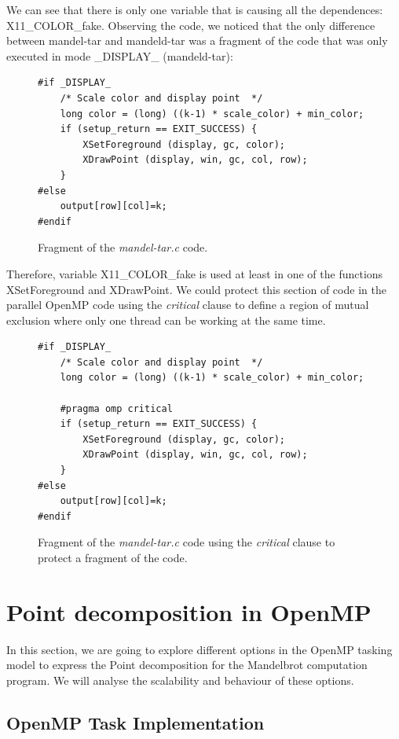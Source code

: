 \documentclass[12pt, a4paper]{article}
\begin{document}
We can see that there is only one variable that is causing all the dependences: X11\_COLOR\_fake. Observing the code, we noticed that the only difference between mandel-tar and mandeld-tar was a fragment of the code that was only executed in mode \_DISPLAY\_ (mandeld-tar):

\begin{figure}[H]
\begin{lstlisting}
#if _DISPLAY_
    /* Scale color and display point  */
    long color = (long) ((k-1) * scale_color) + min_color;
    if (setup_return == EXIT_SUCCESS) {
        XSetForeground (display, gc, color);
        XDrawPoint (display, win, gc, col, row);
    }
#else
    output[row][col]=k;
#endif
\end{lstlisting}
\caption{Fragment of the \textit{mandel-tar.c} code.}
\label{fig:display_code}
\end{figure}

Therefore, variable X11\_COLOR\_fake is used at least in one of the functions XSetForeground and XDrawPoint. We could protect this section of code in the parallel OpenMP code using the \textit{critical} clause to define a region of mutual exclusion where only one thread can be working at the same time.

\begin{figure}[H]
\begin{lstlisting}
#if _DISPLAY_
    /* Scale color and display point  */
    long color = (long) ((k-1) * scale_color) + min_color;
    
    #pragma omp critical
    if (setup_return == EXIT_SUCCESS) {
        XSetForeground (display, gc, color);
        XDrawPoint (display, win, gc, col, row);
    }
#else
    output[row][col]=k;
#endif
\end{lstlisting}
\caption{Fragment of the \textit{mandel-tar.c} code using the \textit{critical} clause to protect a fragment of the code.}
\label{fig:display_code}
\end{figure}

\section{Point decomposition in OpenMP}

In this section, we are going to explore different options in the OpenMP tasking model to express the Point decomposition for the Mandelbrot computation program. We will analyse the scalability and behaviour of these options.

\subsection{OpenMP Task Implementation}
\end{document}
